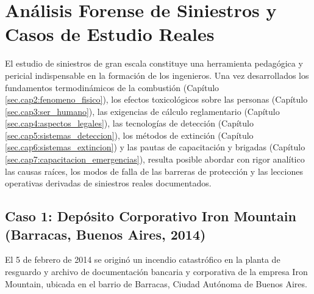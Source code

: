 \chapter{Análisis Forense de Siniestros y Casos de Estudio Reales}
\label{sec.cap8:casos_estudio}

El estudio de siniestros de gran escala constituye una herramienta pedagógica y pericial indispensable en la formación
de los ingenieros. Una vez desarrollados los fundamentos termodinámicos de la combustión (Capítulo
\ref{sec.cap2:fenomeno_fisico}), los efectos toxicológicos sobre las personas (Capítulo \ref{sec.cap3:ser_humano}), las
exigencias de cálculo reglamentario (Capítulo \ref{sec.cap4:aspectos_legales}), las tecnologías de detección (Capítulo
\ref{sec.cap5:sistemas_deteccion}), los métodos de extinción (Capítulo \ref{sec.cap6:sistemas_extincion}) y las pautas
de capacitación y brigadas (Capítulo \ref{sec.cap7:capacitacion_emergencias}), resulta posible abordar con rigor analítico
las causas raíces, los modos de falla de las barreras de protección y las lecciones operativas derivadas de siniestros
reales documentados.

\section{Caso 1: Depósito Corporativo Iron Mountain (Barracas, Buenos Aires, 2014)}
\label{sec.cap8:iron_mountain}

El 5 de febrero de 2014 se originó un incendio catastrófico en la planta de resguardo y archivo de documentación bancaria
y corporativa de la empresa Iron Mountain, ubicada en el barrio de Barracas, Ciudad Autónoma de Buenos Aires.

